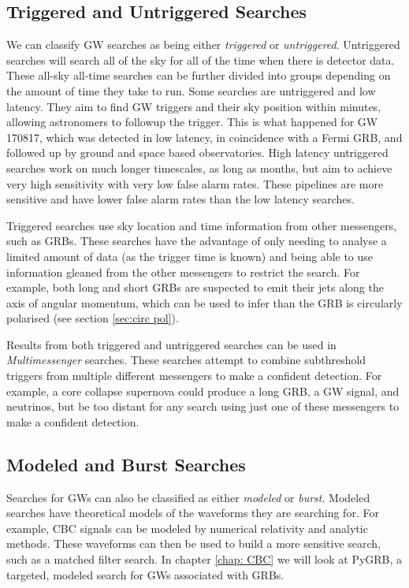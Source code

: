 \documentclass[11pt]{cuthesis}
\begin{document}
\subsection{Triggered and Untriggered Searches}
We can classify GW searches as being either \textit{triggered} or \textit{untriggered}. Untriggered searches will search all of the sky for all of the time when there is detector data. These all-sky all-time searches can be further divided into groups depending on the amount of time they take to run. Some searches are untriggered and low latency\cite{pycbc_live,gstlal_Sachdev:2019,CWB}. They aim to find GW triggers and their sky position within minutes, allowing astronomers to followup the trigger. This is what happened for GW 170817, which was detected in low latency, in coincidence with a Fermi GRB, and followed up by ground and space based observatories. High latency untriggered  searches \cite{pycbc_Usman:2015,gstlal_Sachdev:2019} work on much longer timescales, as long as months, but aim to achieve very high sensitivity with very low false alarm rates. These pipelines are more sensitive and have lower false alarm rates than the low latency searches. 

Triggered searches use sky location and time information from other messengers\cite{pygrb_Williamson:2014,pygrb_harry,xpipeline}, such as GRBs. These searches have the advantage of only needing to analyse a limited amount of data (as the trigger time is known) and being able to use information gleaned from the other messengers to restrict the search. For example, both long and short GRBs are suspected to emit their jets along the axis of angular momentum, which can be used to infer than the GRB is circularly polarised (see section \ref{sec:circ pol}).

Results from both triggered and untriggered searches can be used in \textit{Multimessenger} searches\cite{Connaughton:2016umz,Burns_2019}. These searches attempt to combine subthreshold triggers from multiple different messengers to make a confident detection. For example, a core collapse supernova could produce a long GRB, a GW signal, and neutrinos, but be too distant for any search using just one of these messengers to make a confident detection. 

\subsection{Modeled and Burst Searches}
Searches for GWs can also be classified as either \textit{modeled} or \textit{burst}. Modeled searches have theoretical models of the waveforms they are searching for. For example, CBC signals can be modeled by numerical relativity and analytic methods\cite{phenom_Khan:2015}. These waveforms can then be used to build a more sensitive search, such as a matched filter search. In chapter \ref{chap: CBC} we will look at PyGRB, a targeted, modeled search for GWs associated with GRBs. 
\end{document}
